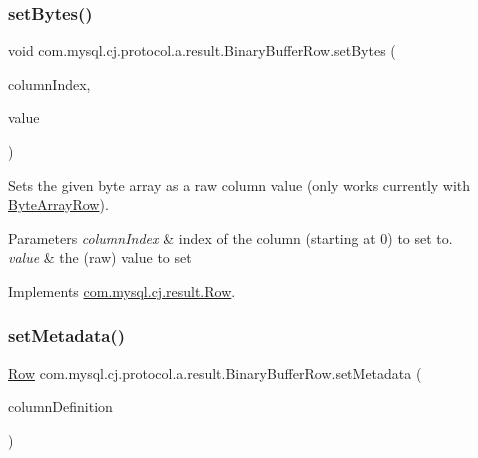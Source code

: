 \subsubsection{\texorpdfstring{set\+Bytes()}{setBytes()}}
{\footnotesize\ttfamily void com.\+mysql.\+cj.\+protocol.\+a.\+result.\+Binary\+Buffer\+Row.\+set\+Bytes (\begin{DoxyParamCaption}\item[{int}]{column\+Index,  }\item[{byte \mbox{[}$\,$\mbox{]}}]{value }\end{DoxyParamCaption})}

Sets the given byte array as a raw column value (only works currently with \mbox{\hyperlink{classcom_1_1mysql_1_1cj_1_1protocol_1_1a_1_1result_1_1_byte_array_row}{Byte\+Array\+Row}}).


\begin{DoxyParams}{Parameters}
{\em column\+Index} & index of the column (starting at 0) to set to. \\
\hline
{\em value} & the (raw) value to set \\
\hline
\end{DoxyParams}


Implements \mbox{\hyperlink{interfacecom_1_1mysql_1_1cj_1_1result_1_1_row_aaa1223e3df4e0f2b1b383d86095e7789}{com.\+mysql.\+cj.\+result.\+Row}}.

\mbox{\label{classcom_1_1mysql_1_1cj_1_1protocol_1_1a_1_1result_1_1_binary_buffer_row_a2bd5930ed5755dca5600e9ee96bad328}} 
\subsubsection{\texorpdfstring{set\+Metadata()}{setMetadata()}}
{\footnotesize\ttfamily \mbox{\hyperlink{interfacecom_1_1mysql_1_1cj_1_1result_1_1_row}{Row}} com.\+mysql.\+cj.\+protocol.\+a.\+result.\+Binary\+Buffer\+Row.\+set\+Metadata (\begin{DoxyParamCaption}\item[{\mbox{\hyperlink{interfacecom_1_1mysql_1_1cj_1_1protocol_1_1_column_definition}{Column\+Definition}}}]{column\+Definition }\end{DoxyParamCaption})}

